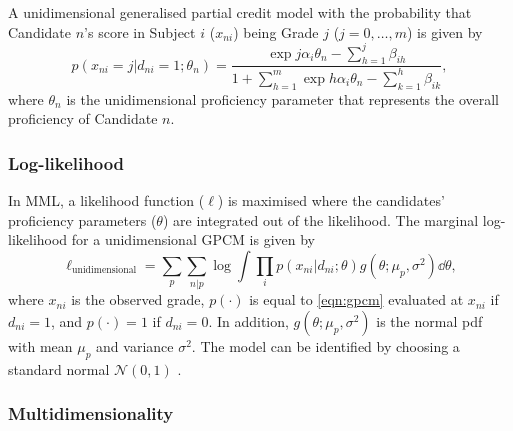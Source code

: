 A unidimensional generalised partial credit model \parencite{muraki:1992} with the probability that Candidate $n$'s score in Subject $i$ ($x_{ni}$) being Grade $j$ ($j=0, \dots, m$) is given by
\begin{equation}\label{eqn:gpcm}
    p \left( x_{ni}=j | d_{ni} = 1; \theta_n \right) = \frac{\exp{j \alpha_i \theta_n - \sum_{h=1}^j \beta_{ih}} }{ 1 + \sum_{h=1}^m \exp{h \alpha_i \theta_n - \sum_{k=1}^h \beta_{ik}} },
\end{equation}
where $\theta_n$ is the unidimensional proficiency parameter that represents the overall proficiency of Candidate $n$.

\subsubsection{Log-likelihood}

In MML, a likelihood function ($\ell$) is maximised where the candidates' proficiency parameters ($\theta$) are integrated out of the likelihood. The marginal log-likelihood for a unidimensional GPCM is given by
\begin{equation}\label{eqn:ll}
    \ell_\text{unidimensional} = \sum_p \sum_{n | p} \log \int \prod_i p( x_{ni} | d_{ni}; \theta ) g(\theta; \mu_p, \sigma^2) \dd \theta,
\end{equation}
where $x_{ni}$ is the observed grade, $p( \cdot )$ is equal to \cref{eqn:gpcm} evaluated at $x_{ni}$ if $d_{ni}=1$, and $p( \cdot ) = 1$ if $d_{ni} = 0$. In addition, $g(\theta; \mu_p, \sigma^2)$ is the normal pdf with mean $\mu_p$ and variance $\sigma^2$. The model can be identified by choosing a standard normal $\mathcal{N}(0,1)$ \parencite{korobko:2008}.

\subsubsection{Multidimensionality}

